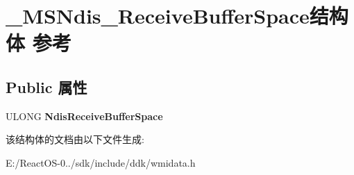 \hypertarget{struct___m_s_ndis___receive_buffer_space}{}\section{\+\_\+\+M\+S\+Ndis\+\_\+\+Receive\+Buffer\+Space结构体 参考}
\label{struct___m_s_ndis___receive_buffer_space}
\subsection*{Public 属性}
\begin{DoxyCompactItemize}
\item 
\mbox{\label{struct___m_s_ndis___receive_buffer_space_a2caa8b4c834738737722c8a6ff155fae}} 
U\+L\+O\+NG {\bfseries Ndis\+Receive\+Buffer\+Space}
\end{DoxyCompactItemize}


该结构体的文档由以下文件生成\+:\begin{DoxyCompactItemize}
\item 
E\+:/\+React\+O\+S-\/0../sdk/include/ddk/wmidata.\+h\end{DoxyCompactItemize}
